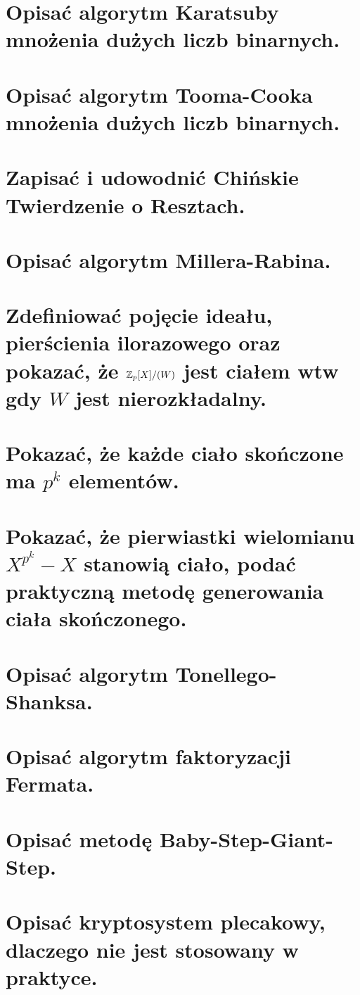 \section{Opisać algorytm Karatsuby mnożenia dużych liczb binarnych.}


\section{Opisać algorytm Tooma-Cooka mnożenia dużych liczb binarnych.}


\section{Zapisać i udowodnić Chińskie Twierdzenie o Resztach.}


\section{Opisać algorytm Millera-Rabina.}


\section{Zdefiniować pojęcie ideału, pierścienia ilorazowego oraz pokazać, że \( \mathbb{Z}_p[X]/(W) \) jest ciałem wtw gdy \( W \) jest nierozkładalny.}


\section{Pokazać, że każde ciało skończone ma \( p^k \) elementów.}


\section{Pokazać, że pierwiastki wielomianu \( X^{p^k} - X \) stanowią ciało, podać praktyczną metodę generowania ciała skończonego.}


\section{Opisać algorytm Tonellego-Shanksa.}


\section{Opisać algorytm faktoryzacji Fermata.}


\section{Opisać metodę Baby-Step-Giant-Step.}


\section{Opisać kryptosystem plecakowy, dlaczego nie jest stosowany w praktyce.}
